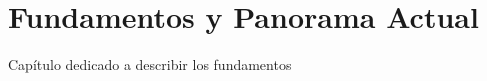 \chapter{Fundamentos y Panorama Actual}
\label{ch:fundamentos}
Capítulo dedicado a describir los fundamentos 
